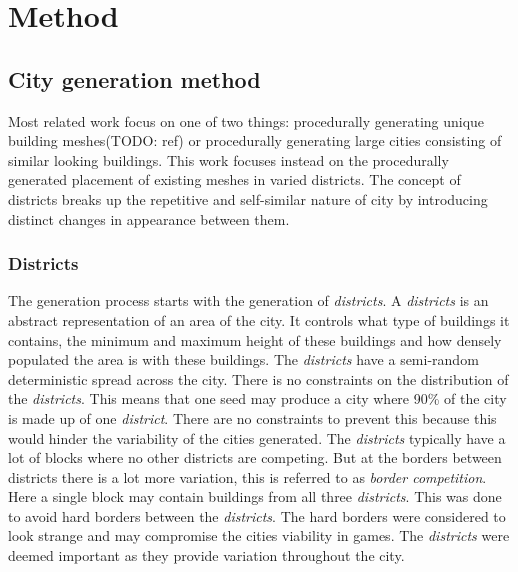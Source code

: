 \section{Method}

	\subsection{City generation method}
	Most related work focus on one of two things: procedurally generating unique building meshes(TODO: ref) or procedurally generating large cities consisting of similar looking buildings\cite{InfiniteCities}. This work focuses instead on the procedurally generated placement of existing meshes in varied districts. The concept of districts breaks up the repetitive and self-similar nature of city by introducing distinct changes in appearance between them.

		\subsubsection{Districts}
		The generation process starts with the generation of \textit{districts}. A \textit{districts} is an abstract representation of an area of the city. It controls what type of buildings it contains, the minimum and maximum height of these buildings and how densely populated the area is with these buildings. The \textit{districts} have a semi-random deterministic spread across the city. There is no constraints on the distribution of the \textit{districts}. This means that one seed may produce a city where 90\% of the city is made up of one \textit{district}. There are no constraints to prevent this because this would hinder the variability of the cities generated. The \textit{districts} typically have a lot of blocks where no other districts are competing. But at the borders between districts there is a lot more variation, this is referred to as \textit{border competition}. Here a single block may contain buildings from all three \textit{districts}. This was done to avoid hard borders between the \textit{districts}. The hard borders were considered to look strange and may compromise the cities viability in games. The \textit{districts} were deemed important as they provide variation throughout the city.
		
